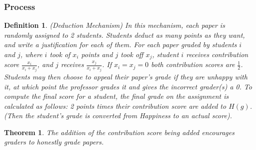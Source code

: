 \documentclass[12pt, Arial]{article}
\newtheorem{theorem}{Theorem}
\newtheorem{definition}{Definition}
\begin{document}
\subsubsection{Process}
\begin{definition}(Deduction Mechanism)
In this mechanism, each paper is randomly assigned to 2 students. Students deduct as many points as they want, and write a justification for each of them. For each paper graded by students $i$ and $j$, where $i$ took of $x_i$ points and $j$ took off $x_j$, student $i$ receives contribution score $\frac{x_i}{x_i + x_j}$, and $j$ receives $\frac{x_j}{x_i + x_j}$. If $x_i = x_j = 0$ both contribution scores are $\frac{1}{2}$. Students may then choose to appeal their paper's grade if they are unhappy with it, at which point the professor grades it and gives the incorrect grader(s) a 0. To compute the final score for a student, the final grade on the assignment is calculated as follows: 2 points times their contribution score are added to $H(g)$. (Then the student's grade is converted from Happiness to an actual score).
\end{definition}
\medskip
\begin{theorem}
The addition of the contribution score being added encourages graders to honestly grade papers.
\end{theorem}
\end{document}
